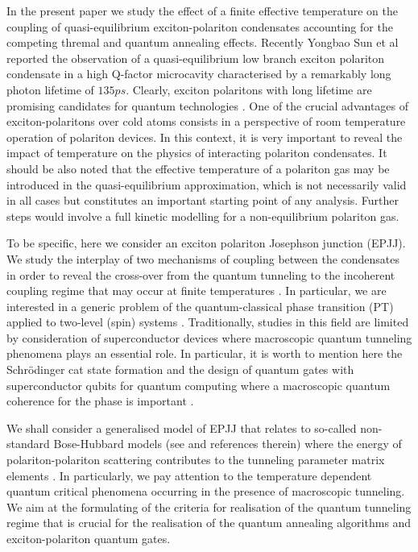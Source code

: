 \documentclass[fleqn,10pt]{wlscirep}
\begin{document}
In the present paper we study the effect of a finite effective temperature on the coupling of quasi-equilibrium exciton-polariton condensates accounting for the competing thremal and quantum annealing effects.  
Recently Yongbao Sun et al \cite{Snoke_2017} reported the observation of a quasi-equilibrium low branch exciton polariton condensate in a high Q-factor microcavity characterised by a remarkably long photon lifetime of $135ps$.
Clearly, exciton polaritons with long lifetime are promising candidates for quantum technologies \cite{Demirchyan}.
One of the crucial advantages of exciton-polaritons over cold atoms consists in a perspective of room temperature operation of polariton devices.
In this context, it is very important to reveal the impact of temperature on the physics of interacting polariton condensates.
It should be also noted that the effective temperature of a polariton gas may be introduced in the quasi-equilibrium approximation, which is not necessarily valid in all cases but constitutes an important starting point of any analysis. Further steps would involve a full kinetic modelling for a non-equilibrium polariton gas.  
 
To be specific, here we consider an exciton polariton Josephson junction (EPJJ).
We study the interplay of two mechanisms of coupling between the condensates in order to reveal the cross-over from the quantum tunneling to the incoherent coupling regime that may occur at finite temperatures \cite{Aleiner, Shelykh_2008, Borgh_2010}. 
In particular, we are interested in a generic problem of the quantum-classical phase transition (PT) applied to two-level (spin) systems \cite{Chudnovsky_1997, Caldeira, Larkin, Riseborough, Zhang, Owerre}.
Traditionally,  studies in this field are limited by consideration of superconductor devices \cite{Ankerhold} where macroscopic quantum tunneling phenomena plays an essential role.
In particular, it is worth to mention here the Schr\"odinger cat state formation \cite{Leggett} and the 	design of quantum gates with superconductor qubits for quantum computing where a macroscopic quantum coherence for the phase is important \cite{Makhlin}.
  
We shall consider a generalised model of EPJJ that relates to so-called non-standard Bose-Hubbard models (see \cite{Dutta} and references therein) where the energy of polariton-polariton scattering contributes to the tunneling parameter matrix elements \cite{Aleiner, Shelykh_2008, Borgh_2010, Solnyshkov_2008, Sarchi}.
In particularly, we pay attention to the temperature dependent quantum critical phenomena occurring in the presence of macroscopic tunneling.
We aim at the formulating of the criteria for realisation of the quantum tunneling regime that is crucial for the realisation of the quantum annealing algorithms and exciton-polariton quantum gates.
\end{document}
